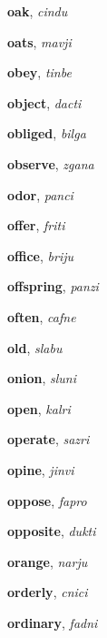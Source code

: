 \documentclass[12pt]{book}
\begin{document}
\begin{description}

\item[ ] \textbf{oak}, \textit{cindu}

\item[ ] \textbf{oats}, \textit{mavji}

\item[ ] \textbf{obey}, \textit{tinbe}

\item[ ] \textbf{object}, \textit{dacti}

\item[ ] \textbf{obliged}, \textit{bilga}

\item[ ] \textbf{observe}, \textit{zgana}

\item[ ] \textbf{odor}, \textit{panci}

\item[ ] \textbf{offer}, \textit{friti}

\item[ ] \textbf{office}, \textit{briju}

\item[ ] \textbf{offspring}, \textit{panzi}

\item[ ] \textbf{often}, \textit{cafne}

\item[ ] \textbf{old}, \textit{slabu}

\item[ ] \textbf{onion}, \textit{sluni}

\item[ ] \textbf{open}, \textit{kalri}

\item[ ] \textbf{operate}, \textit{sazri}

\item[ ] \textbf{opine}, \textit{jinvi}

\item[ ] \textbf{oppose}, \textit{fapro}

\item[ ] \textbf{opposite}, \textit{dukti}

\item[ ] \textbf{orange}, \textit{narju}

\item[ ] \textbf{orderly}, \textit{cnici}

\item[ ] \textbf{ordinary}, \textit{fadni}


\end{description}
\end{document}
